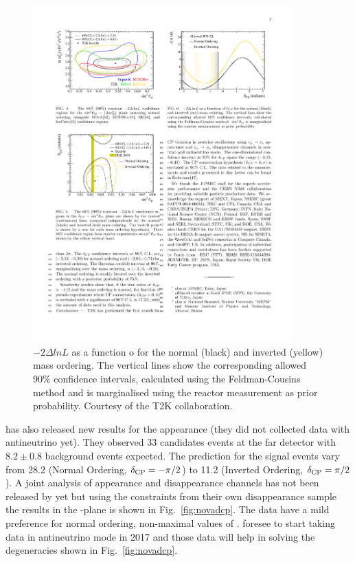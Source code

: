 \begin{figure} [h!]
\begin{center}
\includegraphics[width=10cm]{figures/t2k_dcp_1D.pdf}
\caption{\label{fig:t2kdcp}$-2\Delta ln L$  as a function o \dcp for the normal (black)
and inverted (yellow) mass ordering. The vertical lines show the
corresponding allowed 90\% confidence intervals, calculated
using the Feldman-Cousins method and \sto is marginalised
using the reactor measurement as prior probability. Courtesy of the T2K collaboration.}
\end{center}
\end{figure}

 
\nova has also released new results for the \nue appearance (they did not collected data with antineutrino yet). They observed 33 \nue candidates events at the far detector with $8.2\pm0.8$ background events expected. The prediction for the signal events vary from 28.2 (Normal Ordering, $\delta_{\mathrm{CP}}=-\pi/2$) to 11.2 (Inverted Ordering, $\delta_{\mathrm{CP}}=\pi/2$). A joint analysis of appearance and disappearance channels has not been released by \nova yet but using the constraints from their own disappearance sample the results in the \stt-\dcp plane is shown in Fig.~\ref{fig:novadcp}. The data have a mild preference for normal ordering, non-maximal values of \stt. \nova foresee to start taking data in antineutrino mode in 2017 and those data will help in solving the degeneracies shown in Fig.~\ref{fig:novadcp}. 

